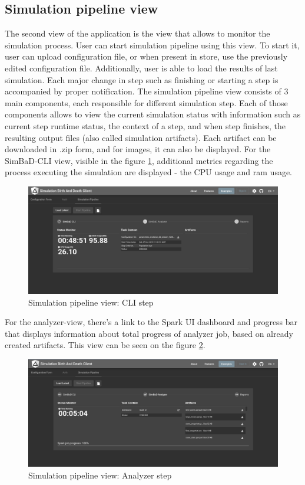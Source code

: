 \subsection{Simulation pipeline view}
The second view of the application is the view that allows to monitor the simulation process. User can start simulation pipeline using this view. To start it, user can upload configuration file, or when present in store, use the previously edited configuration file. Additionally, user is able to load the results of last simulation. Each major change in step such as finishing or starting a step is accompanied by proper notification.
The simulation pipeline view consists of 3 main components, each responsible for different simulation step. Each of those components allows to view the current simulation status with information such as current step runtime status, the context of a step, and when step finishes, the resulting output files (also called simulation artifacts). Each artifact can be downloaded in .zip form, and for images, it can also be displayed. For the SimBaD-CLI view, visible in the figure \ref{fig:sp-cli}, additional metrics regarding the process executing the simulation are displayed - the CPU usage and ram usage. 
\begin{figure}[h!]
	\centering
		\includegraphics[width=0.9\linewidth]{screens/cli-view.png}
	\caption{Simulation pipeline view: CLI step}
	\label{fig:sp-cli}
\end{figure}
For the analyzer-view, there's a link to the Spark UI dashboard and progress bar that displays information about total progress of analyzer job, based on already created artifacts. This view can be seen on the figure \ref{fig:sp-analyzer}.
\begin{figure}[h!]
	\centering
		\includegraphics[width=0.9\linewidth]{screens/analyzer-view.png}
	\caption{Simulation pipeline view: Analyzer step}
	\label{fig:sp-analyzer}
\end{figure}
